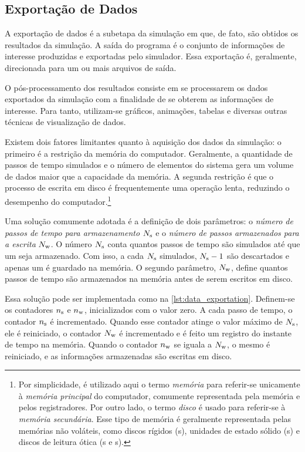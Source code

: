 \subsection{Exportação de Dados}

A exportação de dados é a subetapa da simulação em que, de fato, são obtidos os resultados da simulação. A saída do programa é o conjunto de informações de interesse produzidas e exportadas pelo simulador. Essa exportação é, geralmente, direcionada para um ou mais arquivos de saída.

O pós-processamento dos resultados consiste em se processarem os dados exportados da simulação com a finalidade de se obterem as informações de interesse. Para tanto, utilizam-se gráficos, animações, tabelas e diversas outras técnicas de visualização de dados.

Existem dois fatores limitantes quanto à aquisição dos dados da simulação: o primeiro é a restrição da memória do computador. Geralmente, a quantidade de passos de tempo simulados e o número de elementos do sistema gera um volume de dados maior que a capacidade da memória. A segunda restrição é que o processo de escrita em disco é frequentemente uma operação lenta, reduzindo o desempenho do computador.\footnote{Por simplicidade, é utilizado aqui o termo \textit{memória} para referir-se unicamente à \textit{memória principal} do computador, comumente representada pela memória \RAM{} e pelos registradores. Por outro lado, o termo \textit{disco} é usado para referir-se à \textit{memória secundária}. Esse tipo de memória é geralmente representada pelas memórias não voláteis, como discos rígidos (\HD s), unidades de estado sólido (\SSD s) e discos de leitura ótica (\CD s e \DVD s).}

Uma solução comumente adotada é a definição de dois parâmetros: o \textit{número de passos de tempo para armazenamento} \(N_{\text{s}}\) e o \textit{número de passos armazenados para a escrita} \(N_{\text{w}}\). O número \(N_{\text{s}}\) conta quantos passos de tempo são simulados até que um seja armazenado. Com isso, a cada \(N_{\text{s}}\) simulados, \(N_{\text{s}}-1\) são descartados e apenas um é guardado na memória. O segundo parâmetro, \(N_{\text{w}}\), define quantos passos de tempo são armazenados na memória antes de serem escritos em disco.

Essa solução pode ser implementada como na \cref{lst:data_exportation}. Definem-se os contadores \(n_{\text{s}}\) e \(n_{\text{w}}\), inicializados com o valor zero. A cada passo de tempo, o contador \(n_{\text{s}}\) é incrementado. Quando esse contador atinge o valor máximo de \(N_{\text{s}}\), ele é reiniciado, o contador \(N_{\text{w}}\) é incrementado e é feito um registro do instante de tempo na memória. Quando o contador \(n_{\text{w}}\) se iguala a \(N_{\text{w}}\), o mesmo é reiniciado, e as informações armazenadas são escritas em disco.

